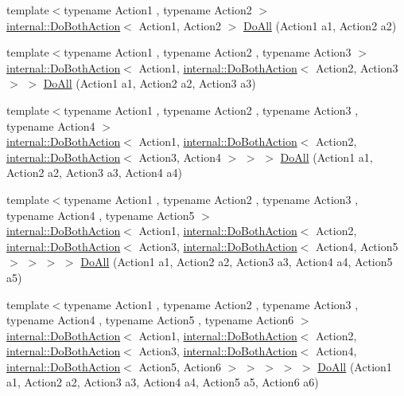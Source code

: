 \begin{DoxyCompactItemize}
\item 
{\footnotesize template$<$typename Action1 , typename Action2 $>$ }\\\hyperlink{classtesting_1_1internal_1_1_do_both_action}{internal\+::\+Do\+Both\+Action}$<$ Action1, Action2 $>$ \hyperlink{namespacetesting_a5f533932753d2af95000e96c4a3042e3}{Do\+All} (Action1 a1, Action2 a2)
\item 
{\footnotesize template$<$typename Action1 , typename Action2 , typename Action3 $>$ }\\\hyperlink{classtesting_1_1internal_1_1_do_both_action}{internal\+::\+Do\+Both\+Action}$<$ Action1, \hyperlink{classtesting_1_1internal_1_1_do_both_action}{internal\+::\+Do\+Both\+Action}$<$ Action2, Action3 $>$ $>$ \hyperlink{namespacetesting_ad6a3ce5e229120ea287286a86394d712}{Do\+All} (Action1 a1, Action2 a2, Action3 a3)
\item 
{\footnotesize template$<$typename Action1 , typename Action2 , typename Action3 , typename Action4 $>$ }\\\hyperlink{classtesting_1_1internal_1_1_do_both_action}{internal\+::\+Do\+Both\+Action}$<$ Action1, \hyperlink{classtesting_1_1internal_1_1_do_both_action}{internal\+::\+Do\+Both\+Action}$<$ Action2, \hyperlink{classtesting_1_1internal_1_1_do_both_action}{internal\+::\+Do\+Both\+Action}$<$ Action3, Action4 $>$ $>$ $>$ \hyperlink{namespacetesting_a790ce08c80a1f8ececa0f2a4f678247c}{Do\+All} (Action1 a1, Action2 a2, Action3 a3, Action4 a4)
\item 
{\footnotesize template$<$typename Action1 , typename Action2 , typename Action3 , typename Action4 , typename Action5 $>$ }\\\hyperlink{classtesting_1_1internal_1_1_do_both_action}{internal\+::\+Do\+Both\+Action}$<$ Action1, \hyperlink{classtesting_1_1internal_1_1_do_both_action}{internal\+::\+Do\+Both\+Action}$<$ Action2, \hyperlink{classtesting_1_1internal_1_1_do_both_action}{internal\+::\+Do\+Both\+Action}$<$ Action3, \hyperlink{classtesting_1_1internal_1_1_do_both_action}{internal\+::\+Do\+Both\+Action}$<$ Action4, Action5 $>$ $>$ $>$ $>$ \hyperlink{namespacetesting_a794c41d43373d7af9cebbc7f1c5e4a57}{Do\+All} (Action1 a1, Action2 a2, Action3 a3, Action4 a4, Action5 a5)
\item 
{\footnotesize template$<$typename Action1 , typename Action2 , typename Action3 , typename Action4 , typename Action5 , typename Action6 $>$ }\\\hyperlink{classtesting_1_1internal_1_1_do_both_action}{internal\+::\+Do\+Both\+Action}$<$ Action1, \hyperlink{classtesting_1_1internal_1_1_do_both_action}{internal\+::\+Do\+Both\+Action}$<$ Action2, \hyperlink{classtesting_1_1internal_1_1_do_both_action}{internal\+::\+Do\+Both\+Action}$<$ Action3, \hyperlink{classtesting_1_1internal_1_1_do_both_action}{internal\+::\+Do\+Both\+Action}$<$ Action4, \hyperlink{classtesting_1_1internal_1_1_do_both_action}{internal\+::\+Do\+Both\+Action}$<$ Action5, Action6 $>$ $>$ $>$ $>$ $>$ \hyperlink{namespacetesting_aa6c87c8d7520fb333f1559487d3e06e9}{Do\+All} (Action1 a1, Action2 a2, Action3 a3, Action4 a4, Action5 a5, Action6 a6)

\end{DoxyCompactItemize}
